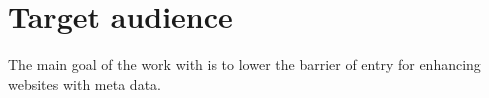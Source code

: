 %
%
%
%


\section{Target audience}
The main goal of the work with \theartefact is to lower the barrier of entry for enhancing websites with meta data.
